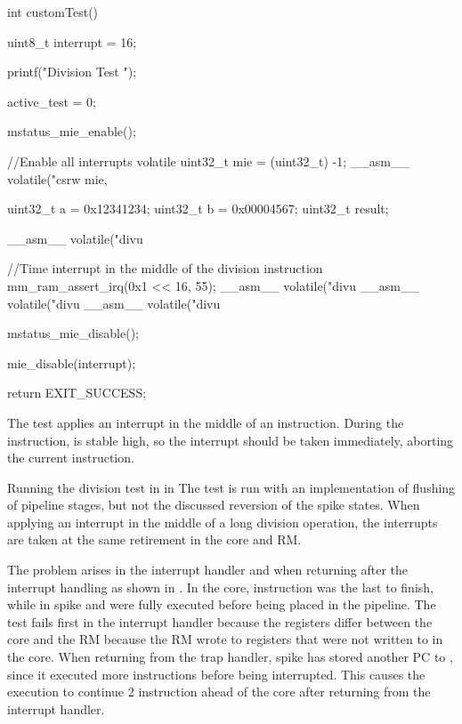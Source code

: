 \begin{clisting}
int customTest() {
    uint8_t interrupt = 16;
    
    printf("Division Test \n");

    active_test = 0;

    mstatus_mie_enable();

    //Enable all interrupts
    volatile uint32_t mie = (uint32_t) -1;
    __asm__ volatile("csrw mie, %

    uint32_t a = 0x12341234;
    uint32_t b = 0x00004567;
    uint32_t result;

    __asm__ volatile("divu %

    //Time interrupt in the middle of the division instruction
    mm_ram_assert_irq(0x1 << 16, 55);
    __asm__ volatile("divu %
    __asm__ volatile("divu %
    __asm__ volatile("divu %

    mstatus_mie_disable();

    mie_disable(interrupt);

    return EXIT_SUCCESS;
}
\end{clisting}

The test applies an interrupt in the middle of an  instruction. During the instruction,  is stable high, so the interrupt should be taken immediately, aborting the current instruction.

Running the division test in  in  
The test is run with an implementation of flushing of pipeline stages, but not the discussed reversion of the spike states. 
When applying an interrupt in the middle of a long division operation, the interrupts are taken at the same retirement in the core and RM.

The problem arises in the interrupt handler and when returning after the interrupt handling as shown in .
In the core, instruction  was the last to finish, while in spike  and  were fully executed before being placed in the pipeline. The test fails first in the interrupt handler because the registers differ between the core and the RM because the RM wrote to registers that were not written to in the core. When returning from the trap handler, spike has stored another PC to , since it executed more instructions before being interrupted. This causes the execution to continue 2 instruction ahead of the core after returning from the interrupt handler. 


